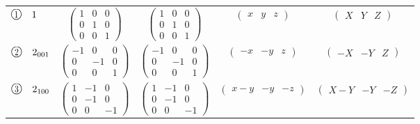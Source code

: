 \documentclass[fleqn,10pt,landscape]{jsarticle}
\begin{document}
\begin{center}
\begin{longtable}{lcccc}
$ {\ooalign{\hfil\resizebox{.8\width}{\height}{1}\hfil\crcr\raise.1ex\hbox{\large$\bigcirc$}}}\quad 1 $ & $ \begin{pmatrix} 1 & 0 & 0 \\ 0 & 1 & 0 \\ 0 & 0 & 1 \end{pmatrix} $ & $ \begin{pmatrix} 1 & 0 & 0 \\ 0 & 1 & 0 \\ 0 & 0 & 1 \end{pmatrix} $ & $ \begin{pmatrix} x & y & z \end{pmatrix} $ & $ \begin{pmatrix} X & Y & Z \end{pmatrix} $ \\
$ {\ooalign{\hfil\resizebox{.8\width}{\height}{2}\hfil\crcr\raise.1ex\hbox{\large$\bigcirc$}}}\quad 2{}_{001} $ & $ \begin{pmatrix} -1 & 0 & 0 \\ 0 & -1 & 0 \\ 0 & 0 & 1 \end{pmatrix} $ & $ \begin{pmatrix} -1 & 0 & 0 \\ 0 & -1 & 0 \\ 0 & 0 & 1 \end{pmatrix} $ & $ \begin{pmatrix} - x & - y & z \end{pmatrix} $ & $ \begin{pmatrix} - X & - Y & Z \end{pmatrix} $ \\
$ {\ooalign{\hfil\resizebox{.8\width}{\height}{3}\hfil\crcr\raise.1ex\hbox{\large$\bigcirc$}}}\quad 2{}_{100} $ & $ \begin{pmatrix} 1 & -1 & 0 \\ 0 & -1 & 0 \\ 0 & 0 & -1 \end{pmatrix} $ & $ \begin{pmatrix} 1 & -1 & 0 \\ 0 & -1 & 0 \\ 0 & 0 & -1 \end{pmatrix} $ & $ \begin{pmatrix} x - y & - y & - z \end{pmatrix} $ & $ \begin{pmatrix} X - Y & - Y & - Z \end{pmatrix} $ \\

\end{longtable}
\end{center}
\end{document}
